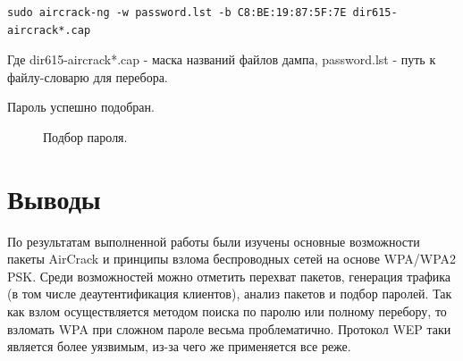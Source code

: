\documentclass[10pt,a4paper]{report}
\begin{document}
\begin{verbatim}
sudo aircrack-ng -w password.lst -b C8:BE:19:87:5F:7E dir615-aircrack*.cap
\end{verbatim}

Где dir615-aircrack*.cap - маска названий файлов дампа, password.lst - путь к файлу-словарю для перебора.

Пароль успешно подобран.

\begin{figure}[h!]	
	\caption{Подбор пароля.}
	\label{Img:6}
\end{figure}
\pagebreak

\section{Выводы}
По результатам выполненной работы были изучены основные возможности пакеты AirCrack и принципы взлома беспроводных сетей на основе WPA/WPA2 PSK. Среди возможностей можно отметить перехват пакетов, генерация трафика (в том числе деаутентификация клиентов), анализ пакетов и подбор паролей. Так как взлом осуществляется методом поиска по паролю или полному перебору, то взломать WPA при сложном пароле весьма проблематично. Протокол WEP таки является более уязвимым, из-за чего же применяется все реже.
\end{document}
